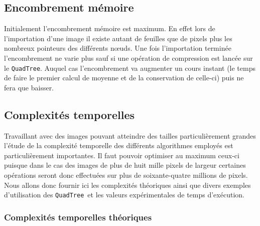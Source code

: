 \documentclass{article}
\newcommand{\info}{\texttt}
\newcommand{\qt}{\info{QuadTree}}
\begin{document}
	\subsection{Encombrement mémoire}
	
	Initialement l'encombrement mémoire est maximum. En effet lors de l'importation d'une image il existe autant de feuilles que de pixels plus les nombreux pointeurs des différents nœuds. Une fois l'importation terminée l'encombrement ne varie plus sauf si une opération de compression est lancée sur le \qt. Auquel cas l'encombrement va augmenter un cours instant (le temps de faire le premier calcul de moyenne et de la conservation de celle-ci) puis ne fera que baisser.
	
	\subsection{Complexités temporelles}
	
	Travaillant avec des images pouvant atteindre des tailles particulièrement grandes l'étude de la complexité temporelle des différents algorithmes employés est particulièrement importantes. Il faut pouvoir optimiser au maximum ceux-ci puisque dans le cas des images de plus de huit mille pixels de largeur certaines opérations seront donc effectuées sur plus de soixante-quatre millions de pixels. Nous allons donc fournir ici les complexités théoriques ainsi que divers exemples d'utilisation des \qt\ et les valeurs expérimentales de temps d'exécution.
	
	\subsubsection{Complexités temporelles théoriques}
	
\end{document}
